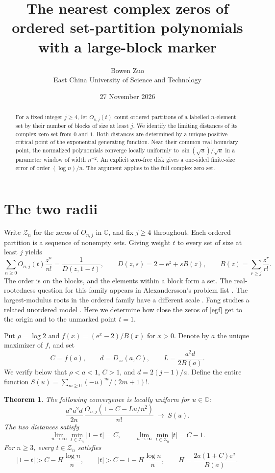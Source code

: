 \documentclass[11pt]{article}
\title{The nearest complex zeros of ordered set-partition polynomials with a large-block marker}
\author{Bowen Zuo\\\small East China University of Science and Technology}
\date{27 November 2026}
\newtheorem{theorem}{Theorem}
\newcommand{\C}{\mathbb C}
\newcommand{\ee}{\mathrm e}
\begin{document}
\maketitle
\begin{abstract}
For a fixed integer $j\ge4$, let $O_{n,j}(t)$ count ordered partitions of a labelled $n$-element set by their number of blocks of size at least $j$. We identify the limiting distances of its complex zero set from $0$ and $1$. Both distances are determined by a unique positive critical point of the exponential generating function. Near their common real boundary point, the normalized polynomials converge locally uniformly to $\sin(\sqrt u)/\sqrt u$ in a parameter window of width $n^{-2}$. An explicit zero-free disk gives a one-sided finite-size error of order $(\log n)/n$. The argument applies to the full complex zero set.
\end{abstract}

\section{The two radii}
Write $\mathcal Z_n$ for the zeros of $O_{n,j}$ in $\C$, and fix $j\ge4$ throughout. Each ordered partition is a sequence of nonempty sets. Giving weight $t$ to every set of size at least $j$ yields
\begin{equation}\label{egf}
 \sum_{n\ge0}O_{n,j}(t)\frac{z^n}{n!}
 =\frac1{D(z,1-t)},\qquad
 D(z,s)=2-\ee^z+s B(z),\qquad B(z)=\sum_{r\ge j}\frac{z^r}{r!}.
\end{equation}
The order is on the blocks, and the elements within a block form a set. The real-rootedness question for this family appears in Alexandersson's problem list \cite{symcat}. The largest-modulus roots in the ordered family have a different scale \cite{outer}. Fang studies a related unordered model \cite{fang}. Here we determine how close the zeros of \eqref{egf} get to the origin and to the unmarked point $t=1$.

Put $\rho=\log 2$ and $f(x)=(\ee^x-2)/B(x)$ for $x>0$. Denote by $a$ the unique maximizer of $f$, and set
\[
 C=f(a),\qquad d=D_{zz}(a,C),\qquad L=\frac{a^2d}{2B(a)}.
\]
We verify below that $\rho<a<1$, $C>1$, and $d=2(j-1)/a$. Define the entire function $S(u)=\sum_{m\ge0}(-u)^m/(2m+1)!$.

\begin{theorem}\label{thm}
The following convergence is locally uniform for $u\in\C$:
\[
 \frac{a^n a^2d}{2n}\,\frac{O_{n,j}(1-C-Lu/n^2)}{n!}
 \ \longrightarrow\ S(u).
\]
The two distances satisfy
\[
 \lim_{n\to\infty}\min_{t\in\mathcal Z_n}|1-t|=C,\qquad
 \lim_{n\to\infty}\min_{t\in\mathcal Z_n}|t|=C-1 .
\]
For $n\ge3$, every $t\in\mathcal Z_n$ satisfies
\[
 |1-t|>C-H\frac{\log n}{n},\qquad
 |t|>C-1-H\frac{\log n}{n},\qquad H=\frac{2a(1+C)\ee^a}{B(a)} .
\]
\end{theorem}
\end{document}
